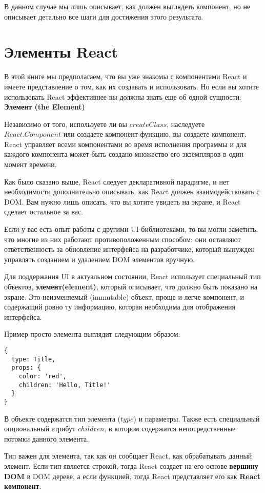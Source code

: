 В данном случае мы лишь описывает, как должен выглядеть компонент, но не описывает детально все шаги для достижения этого результата.

\section{Элементы React}

В этой книге мы предполагаем, что вы уже знакомы с компонентами React и имеете представление о том, как их создавать и использовать. Но если вы хотите использовать React эффективнее вы должны знать еще об одной сущности: \textbf{Элемент (the Element)}

Независимо от того, используете ли вы $createClass$, наследуете $React.Component$ или создаете компонент-функцию, вы создаете компонент. React управляет всеми компонентами во время исполнения программы и для каждого компонента может быть создано множество его экземпляров в один момент времени.

Как было сказано выше, React следует декларативной парадигме, и нет необходимости дополнительно описывать, как React должен взаимодействовать с DOM. Вам нужно лишь описать, что вы хотите увидеть на экране, и React сделает остальное за вас.

Если у вас есть опыт работы с другими UI библиотеками, то вы могли заметить, что многие из них работают противоположенным способом: они оставляют ответственность за обновление интерфейса на разработчике, который вынужден управлять созданием и удалением DOM элементов вручную.

Для поддержания UI в актуальном состоянии, React использует специальный тип объектов, \textbf{элемент(element)}, который описывает, что должно быть показано на экране. Это неизменяемый (immutable) объект, проще и легче компонент, и содержащий ровно ту информацию, которая необходима для отображения интерфейса.

Пример просто элемента выглядит следующим образом:

\begin{lstlisting}
{
  type: Title,
  props: {
    color: 'red',
    children: 'Hello, Title!'
  }
}
\end{lstlisting}

В объекте содержатся тип элемента ($type$) и параметры. Также есть специальный опциональный атрибут $children$, в котором содержатся непосредственные потомки данного элемента.

Тип важен для элемента, так как он сообщает React, как обрабатывать данный элемент. Если тип является строкой, тогда React создает на его основе \textbf{вершину DOM} в DOM дереве, а если функцией, тогда React представляет его как \textbf{React компонент}.

